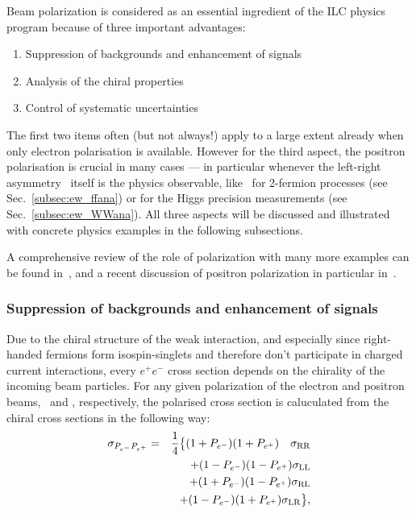 % 
% 

Beam polarization is considered as an essential ingredient of the ILC physics program because of three important advantages:
\begin{enumerate}
\item Suppression of backgrounds and enhancement of signals
\item Analysis of the chiral properties
\item Control of systematic uncertainties
\end{enumerate}
The first two items often (but not always!) apply to a large extent already when only electron polarisation is available. 
However for the third aspect, the positron polarisation is crucial in many cases --- in particular whenever the left-right asymmetry \ALR\ itself is the physics observable, like \eg\ for 2-fermion processes (see Sec.~\ref{subsec:ew_ffana}) or for the Higgs precision measurements (see Sec.~\ref{subsec:ew_WWana}).
All three aspects will be discussed and illustrated with concrete physics examples in the following subsections. 

A comprehensive review of the role of polarization with many more examples can be found in~\cite{MoortgatPick:2005cw}, and a recent discussion of positron polarization in particular in~\cite{Fujii:2018mli}. 


\subsubsection{Suppression of backgrounds and enhancement of signals} 
\label{subsubsec:pol:s_over_b}
Due to the chiral structure of the weak interaction, and especially since right-handed fermions form isospin-singlets and therefore don't participate in charged current interactions, every $e^+e^-$ cross section depends on the chirality of the incoming beam particles.  For any given polarization of the electron and positron beams, \Pem\ and \Pep, respectively, the polarised cross section is caluculated from the chiral cross sections in the following way:
\begin{eqnarray}
\sigma_{P_{e^-}P_{e^+}} &=& \frac{1}{4}\bigl\{
     (1+P_{e^-})(1+P_{e^+}) \quad \sigma_{\mathrm{RR}}  \nonumber \\
&& + (1-P_{e^-})(1-P_{e^+}) \sigma_{\mathrm{LL}} \nonumber \\
&& + (1+P_{e^-})(1-P_{e^+}) \sigma_{\mathrm{RL}} \nonumber \\ 
&& + (1-P_{e^-})(1+P_{e^+}) \sigma_{\mathrm{LR}} \bigr\},
\label{eq:pol:xsec}
\end{eqnarray}


